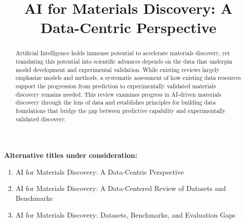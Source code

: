 \documentclass[11pt,a4paper]{article}
\title{%
  \textbf{\large AI for Materials Discovery: A Data-Centric Perspective}%
}
\author{}
\date{}
\begin{document}
\maketitle
\thispagestyle{empty}

\begin{abstract}
\small
Artificial Intelligence holds immense potential to accelerate materials
discovery, yet translating this potential into scientific advances depends
on the data that underpin model development and experimental validation.
While existing reviews largely emphasize models and methods, a systematic
assessment of how existing data resources support the progression from
prediction to experimentally validated materials discovery remains needed.
This review examines progress in AI-driven materials discovery through the
lens of data and establishes principles for building data foundations that
bridge the gap between predictive capability and experimentally validated
discovery.
\end{abstract}

\vspace{0.5em}
\noindent\textbf{Alternative titles under consideration:}
\begin{enumerate}[leftmargin=1.4em,itemsep=1pt,topsep=2pt]
  \item AI for Materials Discovery: A Data-Centric Perspective
  \item AI for Materials Discovery: A Data-Centered Review of Datasets and Benchmarks
  \item AI for Materials Discovery: Datasets, Benchmarks, and Evaluation Gaps
\end{enumerate}

\end{document}
